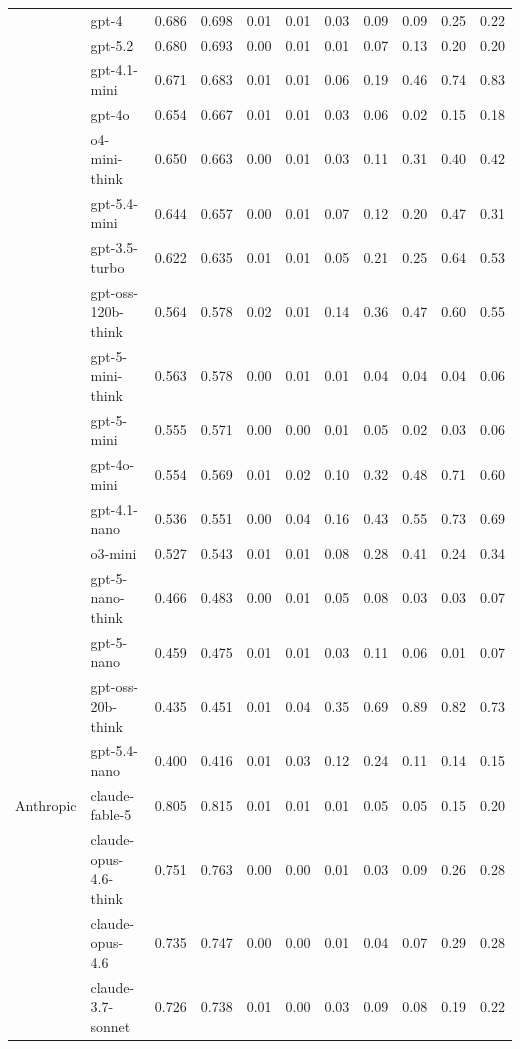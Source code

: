 \begin{longtable}{@{}ll rr rrrrrrr@{}}
 & gpt-4 & 0.686 & 0.698 & 0.01 & 0.01 & 0.03 & 0.09 & 0.09 & 0.25 & 0.22 \\
 & gpt-5.2 & 0.680 & 0.693 & 0.00 & 0.01 & 0.01 & 0.07 & 0.13 & 0.20 & 0.20 \\
 & gpt-4.1-mini & 0.671 & 0.683 & 0.01 & 0.01 & 0.06 & 0.19 & 0.46 & 0.74 & 0.83 \\
 & gpt-4o & 0.654 & 0.667 & 0.01 & 0.01 & 0.03 & 0.06 & 0.02 & 0.15 & 0.18 \\
 & o4-mini-think & 0.650 & 0.663 & 0.00 & 0.01 & 0.03 & 0.11 & 0.31 & 0.40 & 0.42 \\
 & gpt-5.4-mini & 0.644 & 0.657 & 0.00 & 0.01 & 0.07 & 0.12 & 0.20 & 0.47 & 0.31 \\
 & gpt-3.5-turbo & 0.622 & 0.635 & 0.01 & 0.01 & 0.05 & 0.21 & 0.25 & 0.64 & 0.53 \\
 & gpt-oss-120b-think & 0.564 & 0.578 & 0.02 & 0.01 & 0.14 & 0.36 & 0.47 & 0.60 & 0.55 \\
 & gpt-5-mini-think & 0.563 & 0.578 & 0.00 & 0.01 & 0.01 & 0.04 & 0.04 & 0.04 & 0.06 \\
 & gpt-5-mini & 0.555 & 0.571 & 0.00 & 0.00 & 0.01 & 0.05 & 0.02 & 0.03 & 0.06 \\
 & gpt-4o-mini & 0.554 & 0.569 & 0.01 & 0.02 & 0.10 & 0.32 & 0.48 & 0.71 & 0.60 \\
 & gpt-4.1-nano & 0.536 & 0.551 & 0.00 & 0.04 & 0.16 & 0.43 & 0.55 & 0.73 & 0.69 \\
 & o3-mini & 0.527 & 0.543 & 0.01 & 0.01 & 0.08 & 0.28 & 0.41 & 0.24 & 0.34 \\
 & gpt-5-nano-think & 0.466 & 0.483 & 0.00 & 0.01 & 0.05 & 0.08 & 0.03 & 0.03 & 0.07 \\
 & gpt-5-nano & 0.459 & 0.475 & 0.01 & 0.01 & 0.03 & 0.11 & 0.06 & 0.01 & 0.07 \\
 & gpt-oss-20b-think & 0.435 & 0.451 & 0.01 & 0.04 & 0.35 & 0.69 & 0.89 & 0.82 & 0.73 \\
 & gpt-5.4-nano & 0.400 & 0.416 & 0.01 & 0.03 & 0.12 & 0.24 & 0.11 & 0.14 & 0.15 \\
Anthropic & claude-fable-5 & 0.805 & 0.815 & 0.01 & 0.01 & 0.01 & 0.05 & 0.05 & 0.15 & 0.20 \\
 & claude-opus-4.6-think & 0.751 & 0.763 & 0.00 & 0.00 & 0.01 & 0.03 & 0.09 & 0.26 & 0.28 \\
 & claude-opus-4.6 & 0.735 & 0.747 & 0.00 & 0.00 & 0.01 & 0.04 & 0.07 & 0.29 & 0.28 \\
 & claude-3.7-sonnet & 0.726 & 0.738 & 0.01 & 0.00 & 0.03 & 0.09 & 0.08 & 0.19 & 0.22 \\

\end{longtable}

